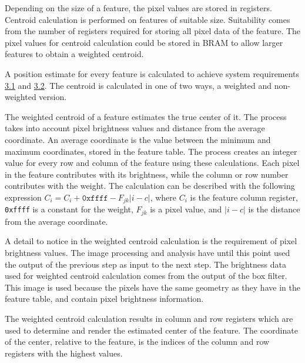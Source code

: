 \documentclass[12pt]{report}
\begin{document}
\par
Depending on the size of a feature, the pixel values are stored in registers. Centroid calculation is performed on features of suitable size. Suitability comes from the number of registers required for storing all pixel data of the feature. The pixel values for centroid calculation could be stored in BRAM to allow larger features to obtain a weighted centroid.
\par
A position estimate for every feature is calculated to achieve system requirements \hyperref[req3.1]{3.1} and \hyperref[req3.2]{3.2}. The centroid is calculated in one of two ways, a weighted and non-weighted version.
\par 
The weighted centroid of a feature estimates the true center of it. The process takes into account pixel brightness values and distance from the average coordinate. An average coordinate is the value between the minimum and maximum coordinates, stored in the feature table. The process creates an integer value for every row and column of the feature using these calculations. Each pixel in the feature contributes with its brightness, while the column or row number contributes with the weight. The calculation can be described with the following expression $C_{i} = C_{i} + \texttt{0xffff} - F_{jk}|i-c|$, where $C_{i}$ is the feature column register, \texttt{0xffff} is a constant for the weight, $F_{jk}$ is a pixel value, and $|i-c|$ is the distance from the average coordinate.
\par
A detail to notice in the weighted centroid calculation is the requirement of pixel brightness values. The image processing and analysis have until this point used the output of the previous step as input to the next step. The brightness data used for weighted centroid calculation comes from the output of the box filter. This image is used because the pixels have the same geometry as they have in the feature table, and contain pixel brightness information.
\par
The weighted centroid calculation results in column and row registers which are used to determine and render the estimated center of the feature. The coordinate of the center, relative to the feature, is the indices of the column and row registers with the highest values.
\par
\end{document}
